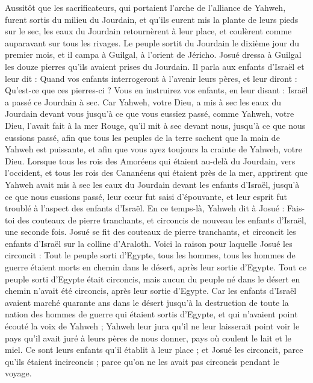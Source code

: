 \begin{multicols}{2}
Aussitôt que les sacrificateurs, qui portaient l’arche de l’alliance de Yahweh, furent sortis du milieu du Jourdain, et qu’ils eurent mis la plante de leurs pieds sur le sec, les eaux du Jourdain retournèrent à leur place, et coulèrent comme auparavant sur tous les rivages.
Le peuple sortit du Jourdain le dixième jour du premier mois, et il campa à Guilgal, à l’orient de Jéricho.
Josué dressa à Guilgal les douze pierres qu’ils avaient prises du Jourdain.
Il parla aux enfants d’Israël et leur dit : Quand vos enfants interrogeront à l’avenir leurs pères, et leur diront : Qu’est-ce que ces pierres-ci ?
Vous en instruirez vos enfants, en leur disant : Israël a passé ce Jourdain à sec.
Car Yahweh, votre Dieu, a mis à sec les eaux du Jourdain devant vous jusqu’à ce que vous eussiez passé, comme Yahweh, votre Dieu, l’avait fait à la mer Rouge, qu’il mit à sec devant nous, jusqu’à ce que nous eussions passé,
afin que tous les peuples de la terre sachent que la main de Yahweh est puissante, et afin que vous ayez toujours la crainte de Yahweh, votre Dieu.
\VerseOne{}Lorsque tous les rois des Amoréens qui étaient au-delà du Jourdain, vers l’occident, et tous les rois des Cananéens qui étaient près de la mer, apprirent que Yahweh avait mis à sec les eaux du Jourdain devant les enfants d’Israël, jusqu’à ce que nous eussions passé, leur cœur fut saisi d’épouvante, et leur esprit fut troublé à l’aspect des enfants d’Israël.
En ce temps-là, Yahweh dit à Josué : Fais-toi des couteaux de pierre tranchants, et\FTNT{} circoncis de nouveau les enfants d’Israël, une seconde fois.
Josué se fit des couteaux de pierre tranchants, et circoncit les enfants d’Israël sur la colline d’Araloth.
Voici la raison pour laquelle Josué les circoncit : Tout le peuple sorti d’Egypte, tous les hommes, tous les hommes de guerre étaient morts en chemin dans le désert, après leur sortie d’Egypte.
Tout ce peuple sorti d’Egypte était circoncis, mais aucun du peuple né dans le désert en chemin n’avait été circoncis, après leur sortie d’Egypte.
Car les enfants d’Israël avaient marché quarante ans dans le désert jusqu’à la destruction de toute la nation des hommes de guerre qui étaient sortis d’Egypte, et qui n’avaient point écouté la voix de Yahweh ; Yahweh leur jura qu’il ne leur laisserait point voir le pays qu’il avait juré à leurs pères de nous donner, pays où coulent le lait et le miel.
Ce sont leurs enfants qu’il établit à leur place ; et Josué les circoncit, parce qu’ils étaient incirconcis ; parce qu’on ne les avait pas circoncis pendant le voyage.

\end{multicols}
